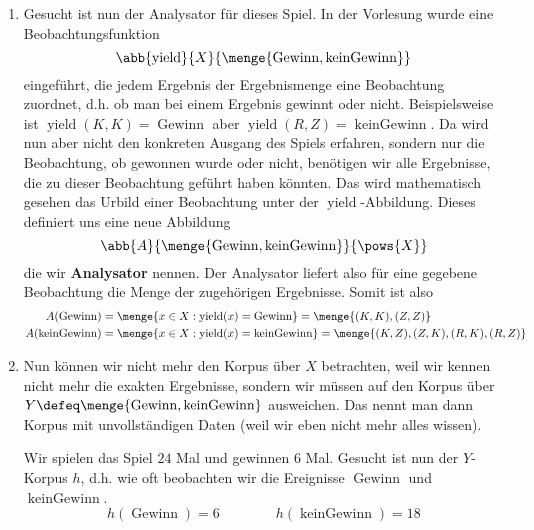 \documentclass[ngerman, a4paper, 12pt]{article}
\newcommand{\begriff}[1]{\textbf{#1}}
\DeclareMathOperator{\yield}{yield}
\DeclareMathOperator{\win}{Gewinn}
\DeclareMathOperator{\nowin}{kein Gewinn}
\begin{document}
\begin{enumerate}[label=\textbf{(\alph*)}, leftmargin=0pt]
	\item
	Gesucht ist nun der Analysator für dieses Spiel. In der Vorlesung wurde eine Beobachtungsfunktion
	\begin{equation*}
		\abb{\yield}{X}{\menge{\win, \nowin}}
	\end{equation*} 
	eingeführt, die jedem Ergebnis der Ergebnismenge eine Beobachtung zuordnet, d.h. ob man bei einem Ergebnis gewinnt oder nicht. Beispielsweise ist $\yield(K,K) = \win$ aber $\yield(R,Z) = \nowin$.
	Da wird nun aber nicht den konkreten Ausgang des Spiels erfahren, sondern nur die Beobachtung, ob gewonnen wurde oder nicht, benötigen wir alle Ergebnisse, die zu dieser Beobachtung geführt haben könnten. Das wird mathematisch gesehen das Urbild einer Beobachtung unter der $\yield$-Abbildung. Dieses definiert uns eine neue Abbildung 
	\begin{equation*}
		\abb{A}{\menge{\win, \nowin}}{\pows{X}}
	\end{equation*} 
	die wir \begriff{Analysator} nennen. Der Analysator liefert also für eine gegebene Beobachtung die Menge der zugehörigen Ergebnisse.
	Somit ist also
	\begin{equation*}
		\begin{aligned}
		A(\win) &= \menge{x \in X: \yield(x) = \win} = \menge{(K,K), (Z,Z)} \\
		A(\nowin) &= \menge{x \in X: \yield(x) = \nowin} = \menge{(K,Z), (Z,K),(R,K),(R,Z)}
		\end{aligned}
	\end{equation*}
	
	\item
	Nun können wir nicht mehr den Korpus über $X$ betrachten, weil wir kennen nicht mehr die exakten Ergebnisse, sondern wir müssen auf den Korpus über $Y \defeq \menge{\win, \nowin}$ ausweichen. Das nennt man dann Korpus mit unvollständigen Daten (weil wir eben nicht mehr alles wissen).
	
	Wir spielen das Spiel $24$ Mal und gewinnen $6$ Mal. Gesucht ist nun der $Y$-Korpus $h$, d.h. wie oft beobachten wir die Ereignisse $\win$ und $\nowin$.
	\begin{equation*}
		h(\win) = 6 \qquad\qquad h(\nowin) = 18
	\end{equation*}
	
	

\end{enumerate}
\end{document}
